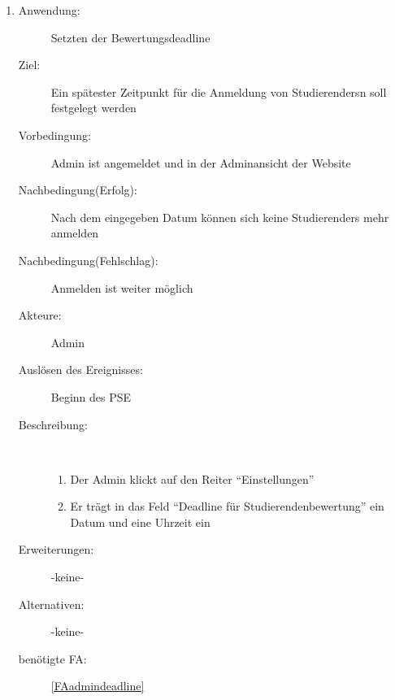 \documentclass[parskip=full]{scrartcl}
\newcommand{\swtLabel}[1]{\textbf{/#1\arabic*0/}}
\begin{document}
\begin{enumerate} [label=\swtLabel{A}]
	
	\item
	\begin{description}
		\item[Anwendung:] Setzten der Bewertungsdeadline
		\item[Ziel:] Ein spätester Zeitpunkt für die Anmeldung von \glspl{Studierender}n soll festgelegt werden
		\item[Vorbedingung:] \gls{Admin} ist angemeldet und in der Adminansicht der Website
		\item[Nachbedingung(Erfolg):] Nach dem eingegeben Datum können sich keine \glspl{Studierender} mehr anmelden
		\item[Nachbedingung(Fehlschlag):] Anmelden ist weiter möglich
		\item[Akteure:] \gls{Admin}
		\item[Auslösen des Ereignisses:] Beginn des \gls{PSE}
		\item[Beschreibung:]~
		\begin{enumerate}[label=\arabic*.]
			\item Der \gls{Admin} klickt auf den Reiter \enquote{Einstellungen}
			\item Er trägt in das Feld \enquote{Deadline für Studierendenbewertung} ein Datum und eine Uhrzeit ein
		\end{enumerate}
		\item[Erweiterungen:] -keine-
		\item[Alternativen:] -keine-
		\item[benötigte FA:] \ref{FAadmindeadline}
	\end{description}
	

\end{enumerate}
\end{document}
